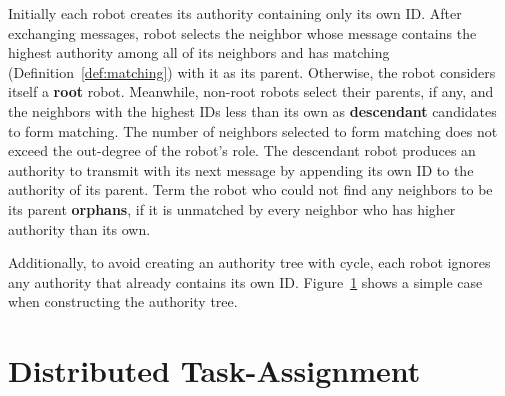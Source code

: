 Initially each robot creates its authority containing only its own ID. 
%
After exchanging messages, robot selects the neighbor whose message contains the highest authority among all of its neighbors and has matching
(Definition~\ref{def:matching}) with it as its parent. 
%
Otherwise, the robot considers itself a \textbf{root} robot. 
%
Meanwhile, non-root robots select their parents, if any, and the neighbors with the highest IDs less than its own as \textbf{descendant} candidates to form matching. 
%
The number of neighbors selected to form matching does not exceed the out-degree of the robot's role. 
%
The descendant robot produces an authority to transmit with its next message by appending its own ID to the authority of its parent. 
%
Term the robot who could not find any neighbors to be its parent \textbf{orphans}, if it is unmatched by every neighbor who has higher authority than its own.


Additionally, to avoid creating an authority tree with cycle, each robot ignores any authority that already contains its own ID.
%
Figure~\ref{fig:authtree} shows a simple case when constructing the authority tree.
\begin{figure}
  
  \label{fig:authtree}
\end{figure}

\section{Distributed Task-Assignment}
\label{sec:task-assgin-algo}

